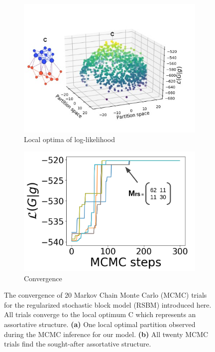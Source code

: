 \begin{figure}[!htb]
\centering
\begin{subfigure}{.5\textwidth} 
\centering
\includegraphics[width=.99\linewidth]{img/chap2/opt_figure_gsbm.jpg}
\caption{Local optima of log-likelihood}
\end{subfigure}
\begin{subfigure}{.45\textwidth} 
\centering
\includegraphics[width=.99\linewidth]{img/chap2/gsbm_converge3.png}
\caption{Convergence}
\end{subfigure}
\caption{The convergence of 20 Markov Chain Monte Carlo (MCMC) trials for the regularized stochastic block model (RSBM) introduced here. All trials converge to the local optimum C which represents an assortative structure. \textbf{(a)} One local optimal partition observed during the MCMC inference for our model. \textbf{(b)} All twenty MCMC trials find the sought-after assortative structure.}
\label{fig:gsbm_3dscatter}
\end{figure}

